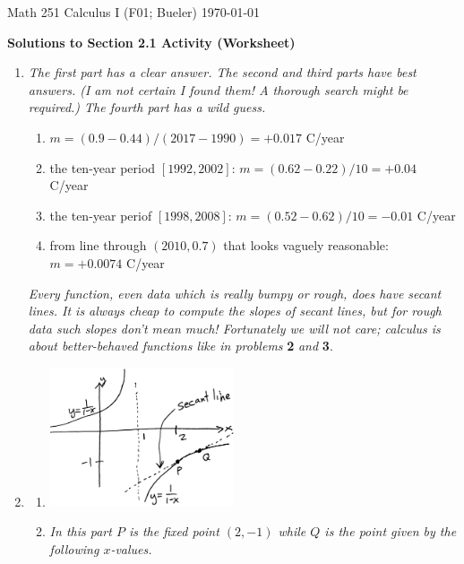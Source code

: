 \documentclass[11pt]{amsart}
\begin{document}
\noindent \scriptsize Math 251 Calculus I (F01; Bueler) \hfill \today

\medskip
\Large\centerline{\textbf{Solutions to  Section 2.1 Activity (Worksheet)}}

\normalsize
\thispagestyle{empty}

\medskip
\renewcommand{\labelenumi}{\textbf{\arabic{enumi}.}}
\begin{enumerate}
\item \emph{The first part has a clear answer.  The second and third parts have best answers.  (I am not certain I found them!  A thorough search might be required.)  The fourth part has a wild guess.} 

\medskip
    \renewcommand{\labelenumii}{\arabic{enumii}.}
    \begin{enumerate}
    \item $m = (0.9-0.44) / (2017-1990) = + 0.017$ C/year
    \item the ten-year period $[1992,2002]$: \quad $m=(0.62 - 0.22) / 10 = + 0.04$ C/year
    \item the ten-year periof $[1998,2008]$: \quad $m=(0.52 - 0.62) / 10 = - 0.01$ C/year
    \item from line through $(2010,0.7)$ that looks vaguely reasonable: $m = + 0.0074$ C/year
    \end{enumerate}

\medskip
\noindent \emph{Every function, even data which is really bumpy or rough, \emph{does} have secant lines.  It is always cheap to compute the slopes of secant lines, but for rough data such slopes don't mean much!  Fortunately we will not care; calculus is about better-behaved functions like in problems} \textbf{2} \emph{and} \textbf{3}.

\item 
\medskip
    \renewcommand{\labelenumii}{\alph{enumii})}
    \begin{enumerate}
    \item \includegraphics[align=t,width=0.45\textwidth]{secantgraph}

\bigskip
    \item \emph{In this part $P$ is the fixed point $(2,-1)$ while $Q$ is the point given by the following $x$-values.}
    

\end{enumerate}
\end{enumerate}
\end{document}
